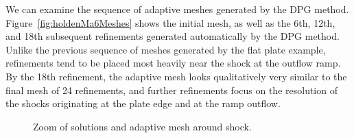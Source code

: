 We can examine the sequence of adaptive meshes generated by the DPG method.  Figure~\ref{fig:holdenMa6Meshes} shows the initial mesh, as well as the 6th, 12th, and 18th subsequent refinements generated automatically by the DPG method.  Unlike the previous sequence of meshes generated by the flat plate example, refinements tend to be placed most heavily near the shock at the outflow ramp.  By the 18th refinement, the adaptive mesh looks qualitatively very similar to the final mesh of 24 refinements, and further refinements focus on the resolution of the shocks originating at the plate edge and at the ramp outflow.  

\begin{figure}
\centering
{}
\caption{Zoom of solutions and adaptive mesh around shock. }
\label{fig:holdenMa6Zoom}
\end{figure}

